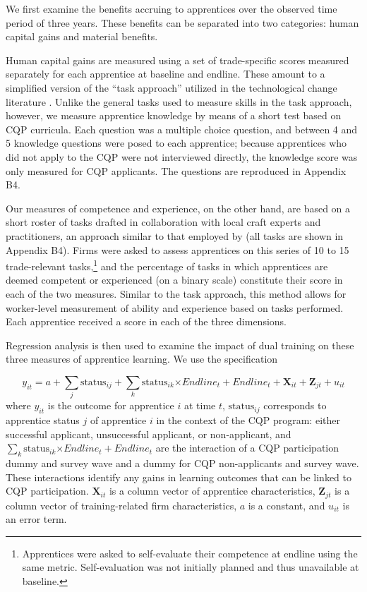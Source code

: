 \documentclass[
  a4paper, twoside, 12pt]{book}
\begin{document}
We first examine the benefits accruing to apprentices over the observed time period of three years. These benefits can be separated into two categories: human capital gains and material benefits.

Human capital gains are measured using a set of trade-specific scores measured separately for each apprentice at baseline and endline. These amount to a simplified version of the ``task approach'' utilized in the technological change literature \autocites[see][]{dicarlo2016,crepon2019}. Unlike the general tasks used to measure skills in the task approach, however, we measure apprentice knowledge by means of a short test based on CQP curricula. Each question was a multiple choice question, and between 4 and 5 knowledge questions were posed to each apprentice; because apprentices who did not apply to the CQP were not interviewed directly, the knowledge score was only measured for CQP applicants. The questions are reproduced in Appendix B4.

Our measures of competence and experience, on the other hand, are based on a short roster of tasks drafted in collaboration with local craft experts and practitioners, an approach similar to that employed by \textcite{hardy2019} (all tasks are shown in Appendix B4). Firms were asked to assess apprentices on this series of 10 to 15 trade-relevant tasks,\footnote{Apprentices were asked to self-evaluate their competence at endline using the same metric. Self-evaluation was not initially planned and thus unavailable at baseline.} and the percentage of tasks in which apprentices are deemed competent or experienced (on a binary scale) constitute their score in each of the two measures. Similar to the task approach, this method allows for worker-level measurement of ability and experience based on tasks performed. Each apprentice received a score in each of the three dimensions.

Regression analysis is then used to examine the impact of dual training on these three measures of apprentice learning. We use the specification

\[ y_{it} = a+\sum_{j}\text{status}_{ij}+\sum_{k}\text{status}_{ik}\text{×}Endline_t+{Endline}_t+\mathbf{X}_{it}+\mathbf{Z}_{jt}+u_{it} \]
where \(y_{it}\) is the outcome for apprentice \(i\) at time \(t\), \(\text{status}_{ij}\) corresponds to apprentice status \(j\) of apprentice \(i\) in the context of the CQP program: either successful applicant, unsuccessful applicant, or non-applicant, and \(\sum_{k}\text{status}_{ik}\text{×}Endline_t+{Endline}_t\) are the interaction of a CQP participation dummy and survey wave and a dummy for CQP non-applicants and survey wave. These interactions identify any gains in learning outcomes that can be linked to CQP participation. \(\mathbf{X}_{it}\) is a column vector of apprentice characteristics, \(\mathbf{Z}_{jt}\) is a column vector of training-related firm characteristics, \(a\) is a constant, and \(u_{it}\) is an error term.
\end{document}
